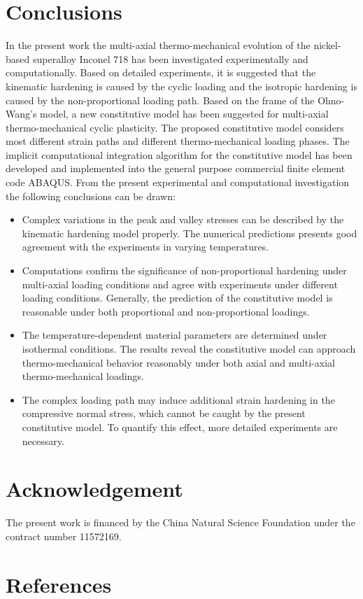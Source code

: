 \documentclass[preprint,5p,twocolumn,11pt,sort&compress]{elsarticle}
\begin{document}
\section{Conclusions}
In the present work the multi-axial thermo-mechanical evolution of the nickel-based superalloy Inconel 718 has been investigated experimentally and computationally.
Based on detailed experiments, it is suggested that the kinematic hardening is caused by the cyclic loading and the isotropic hardening is caused by the non-proportional loading path.
Based on the frame of the Ohno-Wang's model, a new constitutive model has been suggested for multi-axial thermo-mechanical cyclic plasticity.
The proposed constitutive model considers most different strain paths and different thermo-mechanical loading phases.
The implicit computational integration algorithm for the constitutive model has been developed and implemented into the general purpose commercial finite element code ABAQUS.
From the present experimental and computational investigation the following conclusions can be drawn:
\begin{itemize}

\item {Complex variations in the peak and valley stresses can be described by the kinematic hardening model properly. The numerical predictions presents good agreement with the experiments in varying temperatures.}

\item {Computations confirm the significance of non-proportional hardening under multi-axial loading conditions and agree with experiments under different loading conditions. Generally, the prediction of the constitutive model is reasonable under both proportional and non-proportional loadings.}

\item {The temperature-dependent material parameters are determined under isothermal conditions. The results reveal the constitutive model can approach thermo-mechanical behavior reasonably under both axial and multi-axial thermo-mechanical loadings.}

\item{The complex loading path may induce additional strain hardening in the compressive normal stress, which cannot be caught by the present constitutive model. To quantify this effect, more detailed experiments are necessary.}

\end{itemize}


\section*{Acknowledgement} 
The present work is financed by the China Natural Science Foundation under the contract number 11572169. 

\section*{References} 


\end{document}
